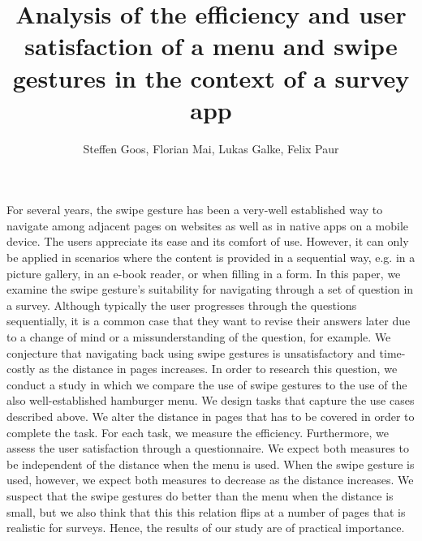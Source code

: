 \documentclass[a4paper]{article}
\author{Steffen Goos, Florian Mai, Lukas Galke, Felix Paur}
\title{Analysis of the efficiency and user satisfaction of a menu and swipe gestures in the context of a survey app}
\begin{document}
\maketitle
For several years, the swipe gesture has been a very-well established way to navigate among adjacent pages on websites as well as in native
apps on a mobile device. The users appreciate its ease and its comfort of use. However, it can only be applied in scenarios where
the content is provided in a sequential way, e.g. in a picture gallery, in an e-book reader, or when filling in a form. In this paper, we
examine the swipe gesture's suitability for navigating through a set of question in a survey. Although typically the user progresses 
through the questions sequentially, it is a common case that they want to revise their answers later due to a change of mind or a missunderstanding
of the question, for example. We conjecture that navigating back using swipe gestures is unsatisfactory and time-costly as the distance in pages
increases. In order to research this question, we conduct a study in which we compare the use of swipe gestures to the use of the also
well-established hamburger menu. We design tasks that capture the use cases described above. We alter the distance in pages
that has to be covered in order to complete the task. For each task, we measure the efficiency. Furthermore, we assess the user satisfaction through a questionnaire. We expect
both measures to be independent of the distance when the menu is used. When the swipe gesture is used, however, we expect both measures to decrease
as the distance increases. We suspect that the swipe gestures do better than the menu when the distance is small, but we also think that this
this relation flips at a number of pages that is realistic for surveys. Hence, the results of our study are of practical importance.
\end{document}
